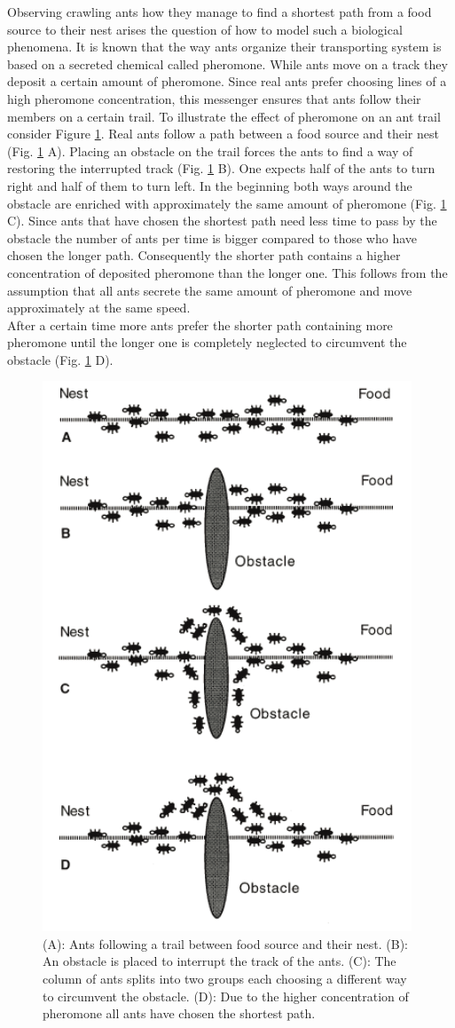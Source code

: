 
Observing crawling ants how they manage to find a shortest path from a food source to their nest arises the question of how to model such a biological phenomena. It is known that the way ants organize their transporting system is based on a secreted chemical called pheromone. While ants move on a track they deposit a certain amount of pheromone. Since real ants prefer choosing lines of a high pheromone concentration, this messenger ensures that ants follow their members on a certain trail.
To illustrate the effect of pheromone on an ant trail consider Figure \ref{fig:ants}. Real ants follow a path between a food source and their nest (Fig. \ref{fig:ants} A). Placing an obstacle on the trail forces the ants to find a way of restoring the interrupted track (Fig. \ref{fig:ants} B). One expects half of the ants to turn right and half of them to turn left. In the beginning both ways around the obstacle are enriched with approximately the same amount of pheromone (Fig. \ref{fig:ants} C). Since ants that have chosen the shortest path need less time to pass by the obstacle the number of ants per time is bigger compared to those who have chosen the longer path. Consequently the shorter path contains a higher concentration of deposited pheromone than the longer one. This follows from the assumption that all ants secrete the same amount of pheromone and move approximately at the same speed. \\
After a certain time more ants prefer the shorter path containing more pheromone until the longer one is completely neglected to circumvent the obstacle (Fig. \ref{fig:ants} D).

\begin{figure}[h!]
\begin{center}
\includegraphics[width=11cm, height= 6 cm]{ants}
\caption{(A): Ants following a trail between food source and their nest. (B): An obstacle is placed to interrupt the track of the ants. (C): The column of ants splits into two groups each choosing a different way to circumvent the obstacle. (D): Due to the higher concentration of pheromone all ants have chosen the shortest path.}
\label{fig:ants}
\end{center}
\end{figure}

